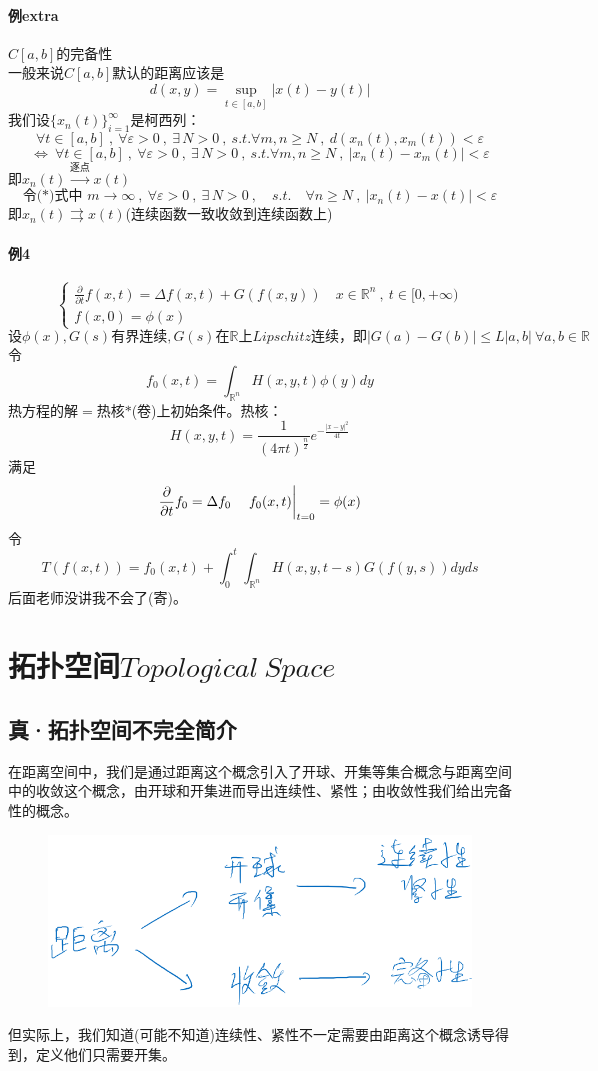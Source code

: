 \paragraph*{例extra} \quad $C[a,b]$的完备性 \\
一般来说$C[a,b]$默认的距离应该是
\[d(x,y)=\mathop {\text{sup}}\limits_{t \in [a,b]}|x(t)-y(t)|\]
我们设$\{x_n(t)\}_{i=1}^{\infty}$是柯西列：
\[\forall t \in [a,b] \ , \ \forall \varepsilon>0 \ , \ \exists \, N>0 \ , \ s.t. \forall m,n \geq N \ , \ d(x_n(t),x_m(t))<\varepsilon\]
\[\Leftrightarrow \ \forall t \in [a,b] \ , \ \forall \varepsilon>0 \ , \ \exists \, N>0 \ , \ s.t. \forall m,n \geq N \ , \ |x_n(t)-x_m(t)|<\varepsilon \tag{*}\]
即$x_n(t) \xrightarrow{\text{逐点}} x(t)$
\[\text{令(*)式中 }m \to \infty \ , \ \forall \varepsilon>0 \ , \ \exists \, N>0 \ , \quad s.t. \quad \forall n \geq N \ , \ |x_n(t)-x(t)|<\varepsilon\]
即$x_n(t) \rightrightarrows x(t)$(连续函数一致收敛到连续函数上)
\paragraph*{例4}
\[\left\{
\begin{array}{c}
    \frac{\partial}{\partial t}f(x,t)=\Delta f(x,t)+G(f(x,y)) \quad x \in \mathbb{R}^n \ , \ t \in [0,+\infty) \\
    f(x,0)=\phi(x)
\end{array}
\right.\]
\[\text{设}\phi(x),G(s)\text{有界连续},G(s)\text{在}\mathbb{R}\text{上} 𝐿𝑖𝑝𝑠𝑐ℎ𝑖𝑡𝑧 \text{连续，即}|G(a)-G(b)| \leq L|a,b| \ \forall a,b \in \mathbb{R}\]
令
\[f_0(x,t)=\int_{\mathbb{R}^n}H(x,y,t)\phi(y)dy\]
热方程的解$=$热核$*$(卷)上初始条件。热核：
\[H(x,y,t)=\frac{1}{(4 \pi t)^{\frac{n}{2}}}e^{-\frac{|x-y|^2}{4t}}\]
满足
\[\frac{\partial}{\partial t}f_0=\Delta f_0 \quad \eval{f_0(x,t)}_{t=0}=\phi(x)\]
令
\[T(f(x,t))=f_0(x,t)+\int_0^t\int_{\mathbb{R}^n}H(x,y,t-s)G(f(y,s))dyds\]
后面老师没讲我不会了(寄)。

\section{拓扑空间$Topological \ Space$} \label{topo}
\subsection{真·拓扑空间不完全简介}
在距离空间中，我们是通过距离这个概念引入了开球、开集等集合概念与距离空间中的收敛这个概念，由开球和开集进而导出连续性、紧性；由收敛性我们给出完备性的概念。
\begin{figure}[htbp]
    \center
    \includegraphics[scale=0.4]{./fig/2.2.1.png}
\end{figure}
但实际上，我们知道(可能不知道)连续性、紧性不一定需要由距离这个概念诱导得到，定义他们只需要开集。

